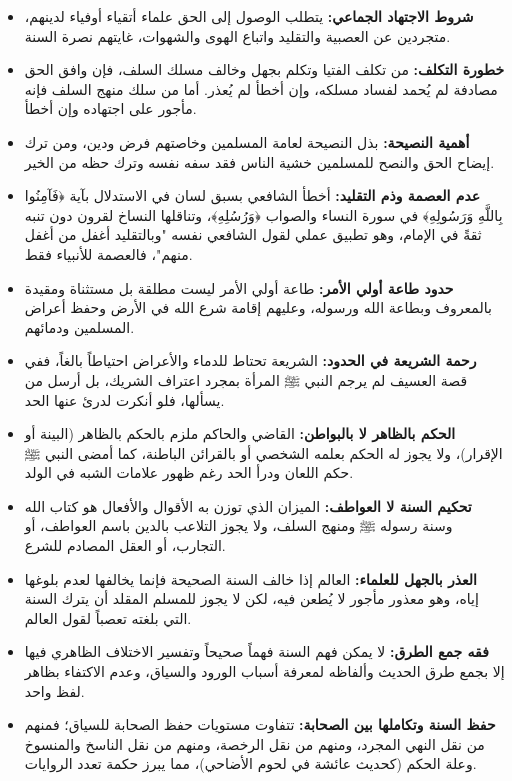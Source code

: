 \begin{itemize}
    \item \textbf{شروط الاجتهاد الجماعي:} يتطلب الوصول إلى الحق علماء أتقياء أوفياء لدينهم، متجردين عن العصبية والتقليد واتباع الهوى والشهوات، غايتهم نصرة السنة.
    \item \textbf{خطورة التكلف:} من تكلف الفتيا وتكلم بجهل وخالف مسلك السلف، فإن وافق الحق مصادفة لم يُحمد لفساد مسلكه، وإن أخطأ لم يُعذر. أما من سلك منهج السلف فإنه مأجور على اجتهاده وإن أخطأ.
    \item \textbf{أهمية النصيحة:} بذل النصيحة لعامة المسلمين وخاصتهم فرض ودين، ومن ترك إيضاح الحق والنصح للمسلمين خشية الناس فقد سفه نفسه وترك حظه من الخير.
    \item \textbf{عدم العصمة وذم التقليد:} أخطأ الشافعي بسبق لسان في الاستدلال بآية ﴿فَآمِنُوا بِاللَّهِ وَرَسُولِهِ﴾ في سورة النساء والصواب ﴿وَرُسُلِهِ﴾، وتناقلها النساخ لقرون دون تنبه ثقةً في الإمام، وهو تطبيق عملي لقول الشافعي نفسه "وبالتقليد أغفل من أغفل منهم"، فالعصمة للأنبياء فقط.
    \item \textbf{حدود طاعة أولي الأمر:} طاعة أولي الأمر ليست مطلقة بل مستثناة ومقيدة بالمعروف وبطاعة الله ورسوله، وعليهم إقامة شرع الله في الأرض وحفظ أعراض المسلمين ودمائهم.
    \item \textbf{رحمة الشريعة في الحدود:} الشريعة تحتاط للدماء والأعراض احتياطاً بالغاً، ففي قصة العسيف لم يرجم النبي ﷺ المرأة بمجرد اعتراف الشريك، بل أرسل من يسألها، فلو أنكرت لدرئ عنها الحد.
    \item \textbf{الحكم بالظاهر لا بالبواطن:} القاضي والحاكم ملزم بالحكم بالظاهر (البينة أو الإقرار)، ولا يجوز له الحكم بعلمه الشخصي أو بالقرائن الباطنة، كما أمضى النبي ﷺ حكم اللعان ودرأ الحد رغم ظهور علامات الشبه في الولد.
    \item \textbf{تحكيم السنة لا العواطف:} الميزان الذي توزن به الأقوال والأفعال هو كتاب الله وسنة رسوله ﷺ ومنهج السلف، ولا يجوز التلاعب بالدين باسم العواطف، أو التجارب، أو العقل المصادم للشرع.
    \item \textbf{العذر بالجهل للعلماء:} العالم إذا خالف السنة الصحيحة فإنما يخالفها لعدم بلوغها إياه، وهو معذور مأجور لا يُطعن فيه، لكن لا يجوز للمسلم المقلد أن يترك السنة التي بلغته تعصباً لقول العالم.
    \item \textbf{فقه جمع الطرق:} لا يمكن فهم السنة فهماً صحيحاً وتفسير الاختلاف الظاهري فيها إلا بجمع طرق الحديث وألفاظه لمعرفة أسباب الورود والسياق، وعدم الاكتفاء بظاهر لفظ واحد.
    \item \textbf{حفظ السنة وتكاملها بين الصحابة:} تتفاوت مستويات حفظ الصحابة للسياق؛ فمنهم من نقل النهي المجرد، ومنهم من نقل الرخصة، ومنهم من نقل الناسخ والمنسوخ وعلة الحكم (كحديث عائشة في لحوم الأضاحي)، مما يبرز حكمة تعدد الروايات.

\end{itemize}
